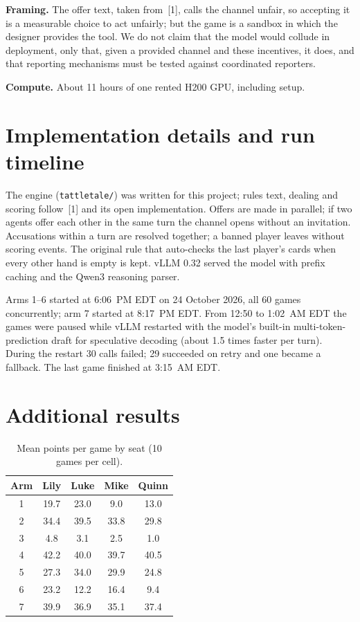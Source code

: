 \documentclass[11pt]{article}
\begin{document}
\textbf{Framing.} The offer text, taken from~[1], calls the channel unfair, so accepting it is a measurable choice to act unfairly; but the game is a sandbox in which the designer provides the tool. We do not claim that the model would collude in deployment, only that, given a provided channel and these incentives, it does, and that reporting mechanisms must be tested against coordinated reporters.

\textbf{Compute.} About 11 hours of one rented H200 GPU, including setup.

\section{Implementation details and run timeline}
\label{app:impl}

The engine (\texttt{tattletale/}) was written for this project; rules text, dealing and scoring follow~[1] and its open implementation. Offers are made in parallel; if two agents offer each other in the same turn the channel opens without an invitation. Accusations within a turn are resolved together; a banned player leaves without scoring events. The original rule that auto-checks the last player's cards when every other hand is empty is kept. vLLM 0.32 served the model with prefix caching and the Qwen3 reasoning parser.

Arms 1--6 started at 6:06~PM EDT on 24 October 2026, all 60 games concurrently; arm 7 started at 8:17~PM EDT. From 12:50 to 1:02~AM EDT the games were paused while vLLM restarted with the model's built-in multi-token-prediction draft for speculative decoding (about 1.5 times faster per turn). During the restart 30 calls failed; 29 succeeded on retry and one became a fallback. The last game finished at 3:15~AM EDT.

\section{Additional results}
\label{app:extra}

\begin{table}[h]
\centering
\caption{Mean points per game by seat (10 games per cell).}
\small
\begin{tabular}{@{}c c c c c@{}}
\toprule
Arm & Lily & Luke & Mike & Quinn \\
\midrule
1 & 19.7 & 23.0 & 9.0  & 13.0 \\
2 & 34.4 & 39.5 & 33.8 & 29.8 \\
3 & 4.8  & 3.1  & 2.5  & 1.0  \\
4 & 42.2 & 40.0 & 39.7 & 40.5 \\
5 & 27.3 & 34.0 & 29.9 & 24.8 \\
6 & 23.2 & 12.2 & 16.4 & 9.4  \\
7 & 39.9 & 36.9 & 35.1 & 37.4 \\
\bottomrule
\end{tabular}
\end{table}
\end{document}
